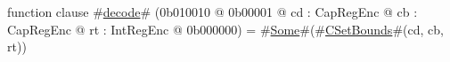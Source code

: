 function clause #\hyperref[zdecode]{decode}# (0b010010 @ 0b00001 @ cd : CapRegEnc @ cb : CapRegEnc @ rt : IntRegEnc @ 0b000000)      = #\hyperref[zSome]{Some}#(#\hyperref[zCSetBounds]{CSetBounds}#(cd, cb, rt))
